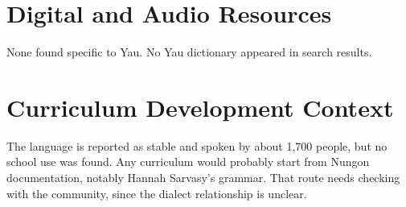 \documentclass[12pt]{article}
\begin{document}
\section{Digital and Audio Resources}
None found specific to Yau. No Yau dictionary appeared in search results.

\section{Curriculum Development Context}
The language is reported as stable and spoken by about 1,700 people, but no school use was found. Any curriculum would probably start from Nungon documentation, notably Hannah Sarvasy's grammar. That route needs checking with the community, since the dialect relationship is unclear.
\end{document}

